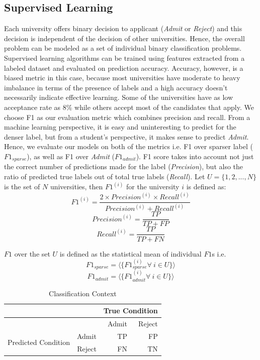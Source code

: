 \documentclass{sig-alternate-05-2015}
\begin{document}
\subsection{Supervised Learning}
\label{subsec:supervised-learning}
Each university offers binary decision to applicant (\textit{Admit} or \textit{Reject}) and this decision is independent of the decision of other universities. Hence, the overall problem can be modeled as a set of individual binary classification problems. Supervised learning algorithms can be trained using features extracted from a labeled dataset and evaluated on prediction accuracy. Accuracy, however, is a biased metric in this case, because most universities have moderate to heavy imbalance in terms of the presence of labels and a high accuracy doesn't necessarily indicate effective learning. Some of the universities have as low acceptance rate as 8\% while others accept most of the candidates that apply. We choose F1 as our evaluation metric which combines precision and recall. From a machine learning perspective, it is easy and uninteresting to predict for the denser label, but from a student's perspective, it makes sense to predict \textit{Admit}. Hence, we evaluate our models on both of the metrics i.e. F1 over sparser label ($F1_{sparse}$), as well as F1 over \textit{Admit} ($F1_{admit}$). F1 score takes into account not just the correct number of predictions made for the label (\textit{Precision}), but also the ratio of predicted true labels out of total true labels (\textit{Recall}). Let $U=\{1,2,...,N\}$ is the set of $N$ universities, then $F1^{(i)}$ for the university $i$ is defined as:
$$F1^{(i)} = \frac{2 \times Precision^{(i)} \times Recall^{(i)}}{Precision^{(i)} + Recall^{(i)}}$$
$$Precision^{(i)} = \frac{TP}{TP + FP}$$
$$Recall^{(i)} = \frac{TP}{TP + FN}$$

$F1$ over the set $U$ is defined as the statistical mean of individual $F1$s i.e.
$$F1_{sparse} = \langle \{ F1^{(i)}_{sparse} \forall~i \in U \} \rangle $$
$$F1_{admit} = \langle \{ F1^{(i)}_{admit} \forall~i \in U \} \rangle $$

\begin{table}[]
\centering
\caption{Classification Context}
\label{tab:classification-context}
\begin{tabular}{|l|r|r|r|}
\hline
                  &  & \multicolumn{2}{r|}{True Condition} \\ \hline
                  &  &  Admit         & Reject          \\ \hline
\multirow{2}{*}{Predicted Condition} & Admit &  TP         & FP          \\ \cline{2-4} 
                  & Reject & FN          & TN          \\ \hline
\end{tabular}
\end{table}
\end{document}
